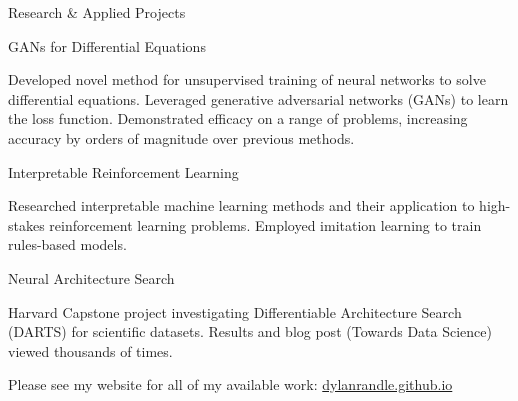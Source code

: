 \documentclass{resume} %
\begin{document}

\begin{rSection}{Research \& Applied Projects}

\begin{rSubsection}{GANs for Differential Equations}{}{}{}
  \item Developed novel method for unsupervised training of neural
  networks to solve differential equations. Leveraged generative
  adversarial networks (GANs) to learn the loss function.
  Demonstrated efficacy on a range of problems, increasing
  accuracy by orders of magnitude over previous methods.
\end{rSubsection}

\begin{rSubsection}{Interpretable Reinforcement Learning}{}{}{}

  \item Researched interpretable machine learning methods and
  their application to high-stakes reinforcement learning problems.
  Employed imitation learning to train rules-based models.

\end{rSubsection}

\begin{rSubsection}{Neural Architecture Search}{}{}{}

  \item Harvard Capstone project investigating Differentiable
  Architecture Search (DARTS) for scientific datasets. Results
  and blog post (Towards Data Science) viewed thousands of times.

\end{rSubsection}


Please see my website for all of my available work: \url{dylanrandle.github.io}

\end{rSection}

\end{document}
